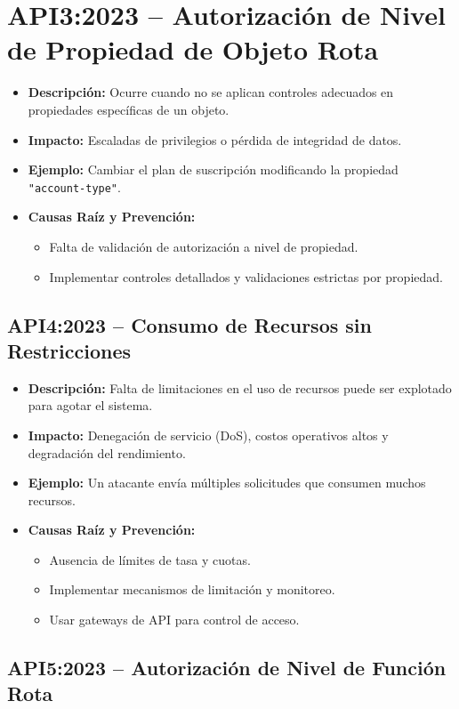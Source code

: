 \documentclass[a4paper,12pt]{article}
\begin{document}
\section{API3:2023 – Autorización de Nivel de Propiedad de Objeto Rota}
\begin{itemize}
    \item \textbf{Descripción:} Ocurre cuando no se aplican controles adecuados en propiedades específicas de un objeto.
    \item \textbf{Impacto:} Escaladas de privilegios o pérdida de integridad de datos.
    \item \textbf{Ejemplo:} Cambiar el plan de suscripción modificando la propiedad \texttt{"account-type"}.
    \item \textbf{Causas Raíz y Prevención:}
    \begin{itemize}
        \item Falta de validación de autorización a nivel de propiedad.
        \item Implementar controles detallados y validaciones estrictas por propiedad.
    \end{itemize}
\end{itemize}

\subsection{API4:2023 – Consumo de Recursos sin Restricciones}
\begin{itemize}
    \item \textbf{Descripción:} Falta de limitaciones en el uso de recursos puede ser explotado para agotar el sistema.
    \item \textbf{Impacto:} Denegación de servicio (DoS), costos operativos altos y degradación del rendimiento.
    \item \textbf{Ejemplo:} Un atacante envía múltiples solicitudes que consumen muchos recursos.
    \item \textbf{Causas Raíz y Prevención:}
    \begin{itemize}
        \item Ausencia de límites de tasa y cuotas.
        \item Implementar mecanismos de limitación y monitoreo.
        \item Usar gateways de API para control de acceso.
    \end{itemize}
\end{itemize}

\subsection{API5:2023 – Autorización de Nivel de Función Rota}
\end{document}
